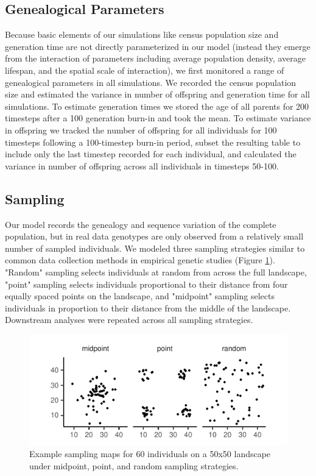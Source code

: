 \documentclass[11pt,twoside,lineno]{preprint}
\begin{document}
\subsection{Genealogical Parameters}
Because basic elements of our simulations like census population size and generation time are not directly parameterized in our model (instead they emerge from the interaction of parameters including average population density, average lifespan, and the spatial scale of interaction), we first monitored a range of genealogical parameters in all simulations. We recorded the census population size and estimated the variance in number of offspring and generation time for all simulations. To estimate generation times we stored the age of all parents for 200 timesteps after a 100 generation burn-in and took the mean. To estimate variance in offspring we tracked the number of offspring for all individuals for 100 timesteps following a 100-timestep burn-in period, subset the resulting table to include only the last timestep recorded for each individual, and calculated the variance in number of offspring across all individuals in timesteps 50-100.

\subsection{Sampling}
Our model records the genealogy and sequence variation of the complete population, but in real data genotypes are only observed from a relatively small number of sampled individuals. We modeled three sampling strategies similar to common data collection methods in empirical genetic studies (Figure \ref{fig:samplemap}). "Random" sampling selects individuals at random from across the full landscape, "point" sampling selects individuals proportional to their distance from four equally spaced points on the landscape, and "midpoint" sampling selects individuals in proportion to their distance from the middle of the landscape. Downstream analyses were repeated across all sampling strategies. 


\begin{figure}[htbp]
\centering
\includegraphics{figures/sampling_maps.pdf}
\caption{Example sampling maps for 60 individuals on a 50x50 landscape under midpoint, point, and random sampling strategies.}
\label{fig:samplemap}
\end{figure}
\end{document}
